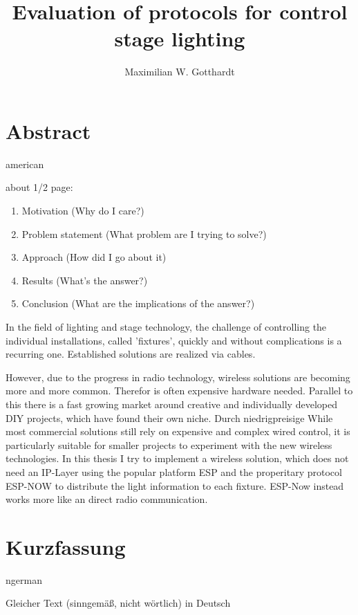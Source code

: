 \documentclass[]{ccs-thesis}
\author{Maximilian W. Gotthardt}
\title{Evaluation of protocols for control stage lighting}
\begin{document}

\maketitle

\thispagestyle{empty}

\cleardoublepage

\chapter*{Abstract}
\begin{otherlanguage*}{american}

about 1/2 page:
\begin{enumerate}
	\item Motivation (Why do I care?)
	\item Problem statement (What problem are I trying to solve?)
	\item Approach (How did I go about it)
	\item Results (What's the answer?)
	\item Conclusion (What are the implications of the answer?)
\end{enumerate}
	

In the field of lighting and stage technology, the challenge of controlling the individual installations, called 'fixtures', quickly and without complications is a recurring one. Established solutions are realized via cables. 

However, due to the progress in radio technology, wireless solutions are becoming more and more common. Therefor is often expensive hardware needed.
Parallel to this there is a fast growing market around creative and individually developed DIY projects, which have found their own niche. Durch niedrigpreisige 
While most commercial solutions still rely on expensive and complex wired control, it is particularly suitable for smaller projects to experiment with the new wireless technologies. 
In this thesis I try to implement a wireless solution, which does not need an IP-Layer using the popular platform ESP and the properitary protocol ESP-NOW to distribute the light information to each fixture. 
ESP-Now instead works more like an direct radio communication.
	
\end{otherlanguage*}

\chapter*{Kurzfassung}
\begin{otherlanguage*}{ngerman}

Gleicher Text (sinngemäß, nicht wörtlich) in Deutsch

\end{otherlanguage*}
\acresetall
\end{document}
